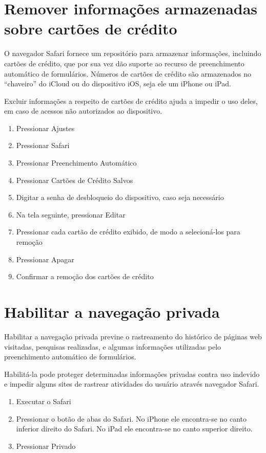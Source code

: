 \section{Remover informa\c c\~oes armazenadas sobre cart\~oes de cr\'edito}

O navegador Safari fornece um reposit\'orio para armazenar informa\c c\~oes, incluindo cart\~oes de cr\'edito, que por sua vez d\~ao suporte ao recurso de  preenchimento autom\'atico de formul\'arios. N\'umeros de cart\~oes de cr\'edito s\~ao armazenados no ``chaveiro'' do iCloud ou do dispositivo iOS, seja ele um iPhone ou iPad. 

Excluir informa\c c\~oes a respeito de cart\~oes de cr\'edito ajuda a impedir o uso deles, em caso de acessos n\~ao autorizados ao dispositivo.

\begin{enumerate}
\item Pressionar Ajustes
\item Pressionar Safari
\item Pressionar Preenchimento Autom\'atico
\item Pressionar Cart\~oes de Cr\'edito Salvos
\item Digitar a senha de desbloqueio do dispositivo, caso seja necess\'ario
\item Na tela seguinte, pressionar Editar
\item Pressionar cada cart\~ao de cr\'edito exibido, de modo a selecion\'a-los para remo\c c\~ao
\item Pressionar Apagar
\item Confirmar a remo\c c\~ao dos cart\~oes de cr\'edito 
\end{enumerate}	

\section{Habilitar a navega\c c\~ao privada}

Habilitar a navega\c c\~ao privada previne o rastreamento do hist\'orico de páginas web visitadas, pesquisas realizadas, e algumas informa\c c\~oes utilizadas pelo preenchimento autom\'atico de formul\'arios.

Habilit\'a-la pode proteger determinadas informa\c c\~oes privadas contra uso indevido e impedir alguns sites de rastrear atividades do usu\'ario atrav\'es navegador Safari.

\begin{enumerate}
\item Executar o Safari
\item Pressionar o bot\~ao de abas do Safari. No iPhone ele encontra-se no canto inferior direito do Safari. No iPad ele encontra-se no canto superior direito. 
\item Pressionar Privado
\end{enumerate}

